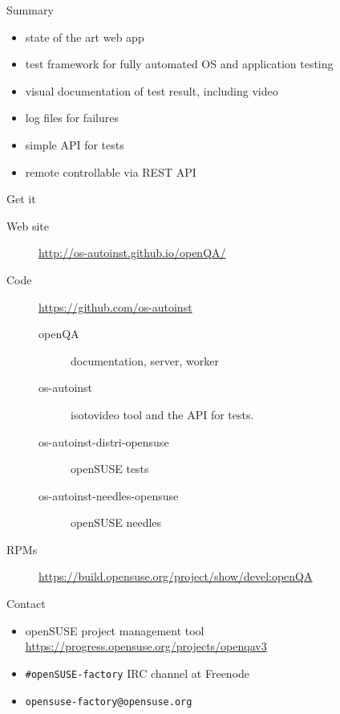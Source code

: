 \documentclass[
]{beamer}
\begin{document}
\begin{frame}{Summary}
  \begin{itemize}
    \item state of the art web app
    \item test framework for fully automated OS and application testing
    \item visual documentation of test result, including video
    \item log files for failures
    \item simple API for tests
    \item remote controllable via REST API
  \end{itemize}
\end{frame}

\begin{frame}{Get it}
  \begin{description}
    \item[Web site] \url{http://os-autoinst.github.io/openQA/}
    \item[Code] \url{https://github.com/os-autoinst}
      \begin{description}
	\item[openQA] documentation, server, worker
	\item[os-autoinst] isotovideo tool and the API for tests.
	\item[os-autoinst-distri-opensuse] openSUSE tests
	\item[os-autoinst-needles-opensuse] openSUSE needles
      \end{description}
    \item[RPMs] \scriptsize{\url{https://build.opensuse.org/project/show/devel:openQA}}
  \end{description}
\end{frame}

\begin{frame}{Contact}
  \begin{itemize}
    \item openSUSE project management tool \url{https://progress.opensuse.org/projects/openqav3}
    \item \texttt{\#openSUSE-factory} IRC channel at Freenode
    \item \texttt{opensuse-factory@opensuse.org}
  \end{itemize}
\end{frame}

{
  \usebackgroundtemplate{}
  
  
  
}


\end{document}
